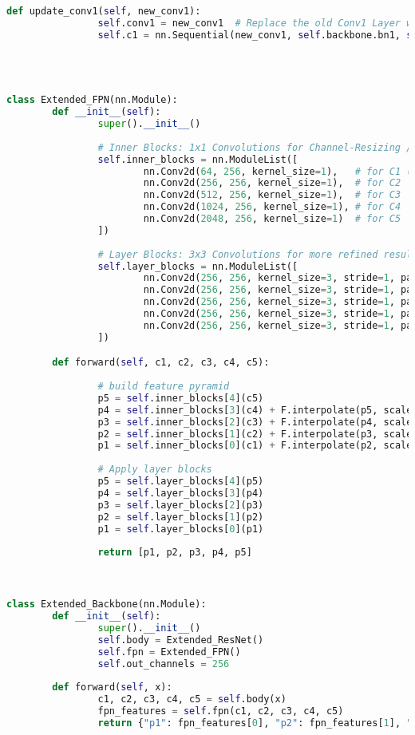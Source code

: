 \begin{lstlisting}[language=Python,caption=Random Augmentation of the Background using cv2 in Python, label=lst:bg-augmentation]
		def update_conv1(self, new_conv1):
				self.conv1 = new_conv1  # Replace the old Conv1 Layer with the new one
				self.c1 = nn.Sequential(new_conv1, self.backbone.bn1, self.backbone.relu)




class Extended_FPN(nn.Module):
		def __init__(self):
				super().__init__()
				
				# Inner Blocks: 1x1 Convolutions for Channel-Resizing / Adjustment
				self.inner_blocks = nn.ModuleList([
						nn.Conv2d(64, 256, kernel_size=1),   # for C1 (64 Channels)
						nn.Conv2d(256, 256, kernel_size=1),  # for C2
						nn.Conv2d(512, 256, kernel_size=1),  # for C3
						nn.Conv2d(1024, 256, kernel_size=1), # for C4
						nn.Conv2d(2048, 256, kernel_size=1)  # for C5
				])
				
				# Layer Blocks: 3x3 Convolutions for more refined results
				self.layer_blocks = nn.ModuleList([
						nn.Conv2d(256, 256, kernel_size=3, stride=1, padding=1),  # for P1
						nn.Conv2d(256, 256, kernel_size=3, stride=1, padding=1),  # for P2
						nn.Conv2d(256, 256, kernel_size=3, stride=1, padding=1),  # for P3
						nn.Conv2d(256, 256, kernel_size=3, stride=1, padding=1),  # for P4
						nn.Conv2d(256, 256, kernel_size=3, stride=1, padding=1)   # for P5
				])

		def forward(self, c1, c2, c3, c4, c5):
				
				# build feature pyramid
				p5 = self.inner_blocks[4](c5)
				p4 = self.inner_blocks[3](c4) + F.interpolate(p5, scale_factor=2, mode="nearest")
				p3 = self.inner_blocks[2](c3) + F.interpolate(p4, scale_factor=2, mode="nearest")
				p2 = self.inner_blocks[1](c2) + F.interpolate(p3, scale_factor=2, mode="nearest")
				p1 = self.inner_blocks[0](c1) + F.interpolate(p2, scale_factor=2, mode="nearest")
				
				# Apply layer blocks
				p5 = self.layer_blocks[4](p5)
				p4 = self.layer_blocks[3](p4)
				p3 = self.layer_blocks[2](p3)
				p2 = self.layer_blocks[1](p2)
				p1 = self.layer_blocks[0](p1)
				
				return [p1, p2, p3, p4, p5]



class Extended_Backbone(nn.Module):
		def __init__(self):
				super().__init__()
				self.body = Extended_ResNet()
				self.fpn = Extended_FPN()
				self.out_channels = 256
		
		def forward(self, x):
				c1, c2, c3, c4, c5 = self.body(x)  
				fpn_features = self.fpn(c1, c2, c3, c4, c5)
				return {"p1": fpn_features[0], "p2": fpn_features[1], "p3": fpn_features[2], "p4": fpn_features[3], "p5": fpn_features[4]}




\end{lstlisting}
